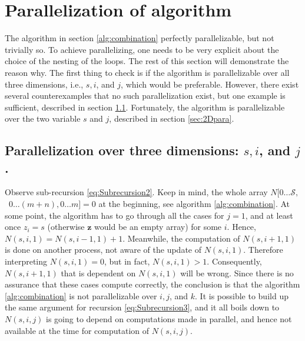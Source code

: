 \documentclass[a4paper]{article}
\begin{document}
\section{Parallelization of algorithm}
\label{sec:paraAlgo}
The algorithm in section \ref{alg:combination} perfectly parallelizable, but not trivially so. To achieve parallelizing, one needs to be very explicit about the choice of the nesting of the loops. The rest of this section will demonstrate the reason why.
The first thing to check is if the algorithm is parallelizable over all three dimensions, i.e., $s, i$, and $j$, which would be preferable. However, there exist several counterexamples that no such parallelization exist, but one example is sufficient, described in section \ref{sec:3Dpara}. Fortunately, the algorithm is parallelizable over the two variable $s$ and $j$, described in section \ref{sec:2Dpara}.
\subsection{Parallelization over three dimensions: $s, i$, and $j$.}
\label{sec:3Dpara}
Observe sub-recursion \ref{eq:Subrecursion2}. Keep in mind, the whole array $N[0\ldots \mathcal{S},$\ $0\ldots(m+n),0\ldots m]=0$ at the beginning, see algorithm \ref{alg:combination}.  At some point, the algorithm has to go through all the cases for $j=1$, and at least once $z_{i}=s$ (otherwise $\bm{z}$ would be an empty array) for some $i$. Hence, $N(s,i,1) = N(s,i-1,1)+1$. Meanwhile, the computation of $N(s,i+1,1)$ is done on another process, not aware of the update of $N(s,i,1)$. Therefore interpreting $N(s,i,1)=0$, but in fact, $N(s,i,1)>1$. Consequently, $N(s,i+1,1)$ that is dependent on $N(s,i,1)$ will be wrong. Since there is no assurance that these cases compute correctly, the conclusion is that the algorithm \ref{alg:combination} is not parallelizable over $i,j$, and $k$.
It is possible to build up the same argument for recursion \ref{eq:Subrecursion3}, and it all boils down to $N(s,i,j)$ is going to depend on computations made in parallel, and hence not available at the time for computation of $N(s,i,j)$.
\end{document}
